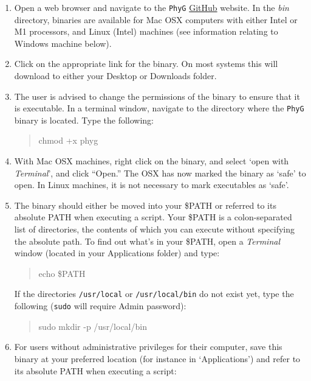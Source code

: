\documentclass[11pt]{article}
\newcommand{\phyg}{\texttt{PhyG} }
\begin{document}
\begin{enumerate}
\item Open a web browser and navigate to the \phyg \href{https://github.com/amnh/PhyGraph}
{GitHub} website. In the \emph{bin} directory, binaries are available for Mac OSX 
computers with either Intel or M1 processors, and Linux (Intel) machines (see information 
relating to Windows machine below).

\item Click on the appropriate link for the binary. On most systems this will 
download to either your Desktop or Downloads folder. 

\item The user is advised to change the permissions of the binary to ensure
that it is executable. In a terminal window, navigate to the directory where the \phyg
binary is located. Type the following:

	\begin{quote}
	chmod +x phyg
	\end{quote}

\item With Mac OSX machines, right click on the binary, and select `open with 
\emph{Terminal}', and click ``Open.'' The OSX has now marked the binary as `safe' 
to open. In Linux machines, it is not necessary to mark executables as `safe'.

\item The binary should either be moved into your \$PATH or referred to its 
absolute PATH when executing a script. Your \$PATH is a colon-separated list 
of directories, the contents of which you can execute without specifying the 
absolute path. To find out what's in your \$PATH, open a \textit{Terminal} window 
(located in your Applications folder) and type: 

	\begin{quote}
	echo \$PATH
	\end{quote}

If the directories \texttt{/usr/local} or \texttt{/usr/local/bin} do not exist yet, type the 
following (\texttt{sudo} will require Admin password): 

	\begin{quote}
	sudo mkdir -p /usr/local/bin
	\end{quote}

\item For users without administrative privileges for their computer, save
this binary at your preferred location (for instance in `Applications') and refer to its absolute
PATH when executing a script: 


\end{enumerate}
\end{document}
